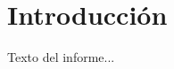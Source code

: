\documentclass{informeutn}
\begin{document}
\maketitle

\tableofcontents
\newpage

\section{Introducción}

Texto del informe...
\end{document}
